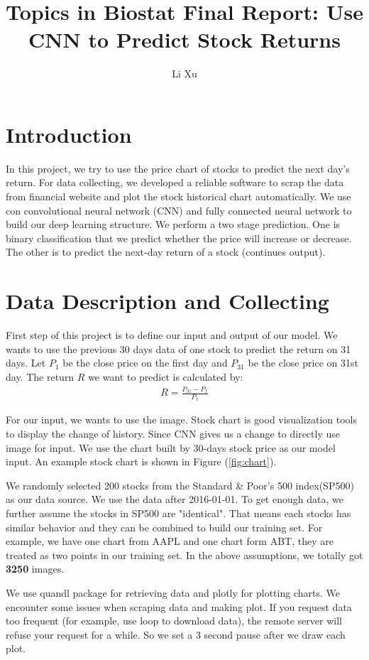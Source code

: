\documentclass[12pt]{article}
\title{Topics in Biostat Final Report: Use CNN to Predict Stock Returns}
\author{Li Xu}
\begin{document}
\maketitle

\section{Introduction}
In this project, we try to use the price chart of stocks to predict the next day's return. For data collecting, we developed a reliable software to scrap the data from financial website and plot the stock historical chart automatically.  We use con convolutional neural network (CNN) and fully connected neural network to build our deep learning structure. We perform a two stage prediction. One is binary classification that we predict whether the price will increase or decrease. The other is to predict the next-day return of a stock (continues output). 

\section{Data Description and Collecting}
First step of this project is to define our input and output of our model. We wants to use the previous 30 days data of one stock to predict the return on 31 days. Let $P_1$ be the close price on the first day and $P_{31}$ be the close price on 31st day. The return $R$ we want to predict is calculated by:
\begin{align}
R=\frac{P_{31}-P_1}{P_1}
\end{align}

For our input, we wants to use the image. Stock chart is good visualization tools to display the change of history. Since CNN gives us a change to directly use image for input. We use the chart built by 30-days stock price as our model input.  An example stock chart is shown in Figure (\ref{fig:chart}).

We randomly selected 200 stocks from the Standard \& Poor's 500 index(SP500) as our data source. We use the data after 2016-01-01. To get enough data, we further assume the stocks in SP500 are "identical". That means each stocks has similar behavior and they can be combined to build our training set. For example, we have one chart from AAPL and one chart form ABT, they are treated as two points in our training set. In the above assumptions, we totally got \textbf{3250} images.

We use quandl package for retrieving data and plotly for plotting charts. We encounter some issues when scraping data and making plot. If you request data too frequent (for example, use loop to download data), the remote server will refuse your request for a while. So  we set a 3 second pause after we draw each plot.
\end{document}

